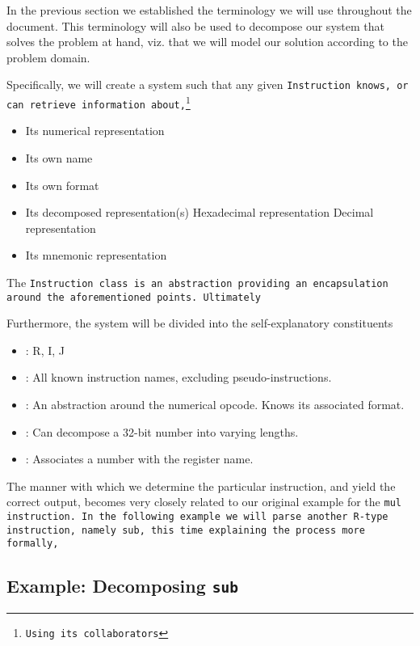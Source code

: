In the previous section we established the terminology we will use
throughout the document. This terminology will also be used to
decompose our system that solves the problem at hand, viz. that
we will model our solution according to the problem domain.

Specifically, we will create a system such that any given
\tt{Instruction} knows, or can retrieve information
about,\footnote{Using its collaborators}

\begin{itemize}
\item Its numerical representation
\item Its own name
\item Its own format
\item Its decomposed representation(s)
\subitem Hexadecimal representation
\subitem Decimal representation
\item Its mnemonic representation
\end{itemize}

The \tt{Instruction} class is an abstraction providing an
encapsulation around the aforementioned points. Ultimately

Furthermore, the system will be divided into the self-explanatory
constituents

\begin{itemize}
\item \formatm: R, I, J
\item \inamem: All known instruction names, excluding
  pseudo-instructions.
\item \opcodem: An abstraction around the numerical opcode. Knows its
  associated format.
\item \decomposedm: Can decompose a 32-bit number into
  varying lengths.
\item \registerm: Associates a number with the register name.
\end{itemize}

The manner with which we determine the particular instruction, and
yield the correct output, becomes very closely related to our original
example for the \tt{mul} instruction. In the following example
we will parse another R-type instruction, namely \tt{sub}, this
time explaining the process more formally,

\subsection{Example: Decomposing \texttt{sub}}

